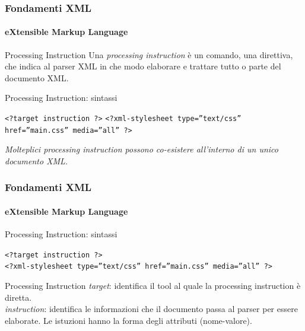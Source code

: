 
\begin{frame}
    \frametitle{Fondamenti XML}
    \framesubtitle{eXtensible Markup Language}
    \addtocounter{nframe}{1}

	\begin{block}{Processing Instruction}
		Una \textit{processing instruction} è un comando, una direttiva, che indica al parser XML in che modo elaborare e trattare tutto o parte del documento XML.
	\end{block}

	\begin{block}{Processing Instruction: sintassi}
		\begin{center}
			\texttt{<?target instruction ?>}
			\texttt{<?xml-stylesheet type=”text/css” href=”main.css” media=”all” ?>}
		\end{center}
	\end{block}
\textit{Molteplici processing instruction possono co-esistere all'interno di un unico documento XML.}

\end{frame}



\begin{frame}
    \frametitle{Fondamenti XML}
    \framesubtitle{eXtensible Markup Language}
    \addtocounter{nframe}{1}

	\begin{block}{Processing Instruction: sintassi}
		\begin{center}
			\texttt{<?target instruction ?>}
			\\\texttt{<?xml-stylesheet type=”text/css” href=”main.css” media=”all” ?>}
		\end{center}
	\end{block}


	\begin{block}{Processing Instruction}
		 \textit{target}: identifica il tool al quale la processing instruction è diretta.
		 \\\textit{instruction}: identifica le informazioni che il documento passa al parser per essere elaborate. Le istuzioni hanno la forma degli attributi (nome-valore).
	\end{block}

\end{frame}


